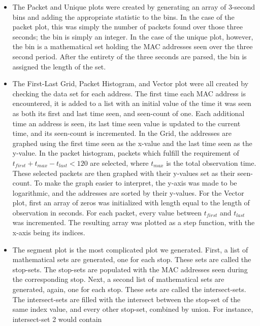 \documentclass[12pt,journal,compsoc]{IEEEtran}
\begin{document}
    \begin{itemize}
    \item The Packet and Unique plots were created by generating an array of 3-second bins and adding the appropriate statistic to the bins.
      In the case of the packet plot, this was simply the number of packets found over those three seconds; the bin is simply an integer.
      In the case of the unique plot, however, the bin is a mathematical set holding the MAC addresses seen over the three second period.
      After the entirety of the three seconds are parsed, the bin is assigned the length of the set.
    \item The First-Last Grid, Packet Histogram, and Vector plot were all created by checking the data set for each address.
      The first time each MAC address is encountered, it is added to a list with an initial value of the time it was seen as both its first and last time seen, and seen-count of one.
      Each additional time an address is seen, its last time seen value is updated to the current time, and its seen-count is incremented.
      In the Grid, the addresses are graphed using the first time seen as the x-value and the last time seen as the y-value.
      In the packet histogram, packets which fulfill the requirement of \(t_{first} + t_{max} - t_{last} < 120\) are selected, where \(t_{max}\) is the total observation time.
      These selected packets are then graphed with their y-values set as their seen-count.
      To make the graph easier to interpret, the y-axis was made to be logarithmic, and the addresses are sorted by their y-values.
      For the Vector plot, first an array of zeros was initialized with length equal to the length of observation in seconds.
      For each packet, every value between \(t_{first}\) and \(t_{last}\) was incremented.
      The resulting array was plotted as a step function, with the x-axis being its indices.
    \item The segment plot is the most complicated plot we generated.
      First, a list of mathematical sets are generated, one for each stop.
      These sets are called the stop-sets.
      The stop-sets are populated with the MAC addresses seen during the corresponding stop.
      Next, a second list of mathematical sets are generated, again, one for each stop.
      These sets are called the intersect-sets.
      The intersect-sets are filled with the intersect between the stop-set of the same index value, and every other stop-set, combined by union.
      For instance, intersect-set 2 would contain
      \begin{multline*}

\end{multline*}
\end{itemize}
\end{document}
